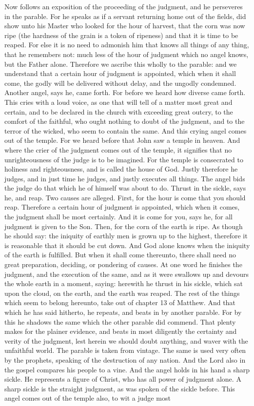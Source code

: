 Now follows an exposition of the proceeding of the judgment, and he perseveres in the parable. For he speaks as if a servant returning home out of the fields, did show unto his Master who looked for the hour of harvest, that the corn was now ripe (the hardness of the grain is a token of ripeness) and that it is time to be reaped. For else it is no need to admonish him that knows all things of any thing, that he remembers not: much less of the hour of judgment which no angel knows, but the Father alone. Therefore we ascribe this wholly to the parable: and we understand that a certain hour of judgment is appointed, which when it shall come, the godly will be delivered without delay, and the ungodly condemned. Another angel, says he, came forth. For before we heard how diverse came forth. This cries with a loud voice, as one that will tell of a matter most great and certain, and to be declared in the church with exceeding great outcry, to the comfort of the faithful, who ought nothing to doubt of the judgment, and to the terror of the wicked, who seem to contain the same. And this crying angel comes out of the temple. For we heard before that John saw a temple in heaven. And where the crier of the judgment comes out of the temple, it signifies that no unrighteousness of the judge is to be imagined. For the temple is consecrated to holiness and righteousness, and is called the house of God. Justly therefore he judges, and in just time he judges, and justly executes all things. The angel bids the judge do that which he of himself was about to do. Thrust in the sickle, says he, and reap. Two causes are alleged. First, for the hour is come that you should reap. Therefore a certain hour of judgment is appointed, which when it comes, the judgment shall be most certainly. And it is come for you, says he, for all judgment is given to the Son. Then, for the corn of the earth is ripe. As though he should say: the iniquity of earthly men is grown up to the highest, therefore it is reasonable that it should be cut down. And God alone knows when the iniquity of the earth is fulfilled. But when it shall come thereunto, there shall need no great preparation, deciding, or pondering of causes. At one word he finishes the judgment, and the execution of the same, and as it were swallows up and devours the whole earth in a moment, saying: herewith he thrust in his sickle, which sat upon the cloud, on the earth, and the earth was reaped. The rest of the things which seem to belong hereunto, take out of chapter 13 of Matthew. And that which he has said hitherto, he repeats, and beats in by another parable. For by this he shadows the same which the other parable did commend. That plenty makes for the plainer evidence, and beats in most diligently the certainty and verity of the judgment, lest herein we should doubt anything, and waver with the unfaithful world. The parable is taken from vintage. The same is used very often by the prophets, speaking of the destruction of any nation. And the Lord also in the gospel compares his people to a vine. And the angel holds in his hand a sharp sickle. He represents a figure of Christ, who has all power of judgment alone. A sharp sickle is the straight judgment, as was spoken of the sickle before. This angel comes out of the temple also, to wit a judge most 